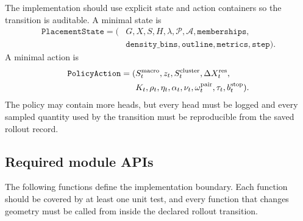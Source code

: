 \documentclass[11pt]{article}
\newcommand{\Pset}{\mathcal{P}}
\newcommand{\Audit}{\mathcal{A}}
\begin{document}
The implementation should use explicit state and action containers so the transition is auditable. A minimal state is
\[
\begin{aligned}
\texttt{PlacementState}=(&G,X,S,H,\lambda,\Pset,\Audit,\texttt{memberships},\\
&\texttt{density\_bins},\texttt{outline},\texttt{metrics},\texttt{step}).
\end{aligned}
\]
A minimal action is
\[
\begin{aligned}
\texttt{PolicyAction}=(&S_t^{\rm macro},z_t,S_t^{\rm cluster},\Delta X_t^{\rm res},\\
&K_t,\rho_t,\eta_t,\alpha_t,\nu_t,\omega_t^{\rm pair},\tau_t,b_t^{\rm stop}).
\end{aligned}
\]
The policy may contain more heads, but every head must be logged and every sampled quantity used by the transition must be reproducible from the saved rollout record.


\subsection{Required module APIs}

The following functions define the implementation boundary. Each function should be covered by at least one unit test, and every function that changes geometry must be called from inside the declared rollout transition.
\end{document}
